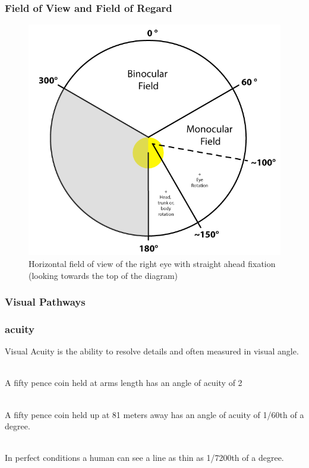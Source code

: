 \begin{frame}
	\frametitle{Field of View and Field of Regard}
	\begin{figure}
		\includegraphics[scale=.3]{assets/fov} 
		\caption{Horizontal field of view of the right eye with straight ahead fixation (looking towards the top of the diagram)}
	\end{figure}
\end{frame}

\begin{frame}
	\frametitle{Visual Pathways}

\end{frame}

\begin{frame}
	\frametitle{acuity}
	Visual Acuity is the ability to resolve details and often measured in visual angle. \\~\\ \pause
	
	A fifty pence coin held at arms length has an angle of acuity of 2\degree \\~\\ \pause
	
	A fifty pence coin held up at 81 meters away has an angle of acuity of 1/60th of a degree. \\~\\ \pause
	
	In perfect conditions a human can see a line as thin as 1/7200th of a degree. 
\end{frame}

